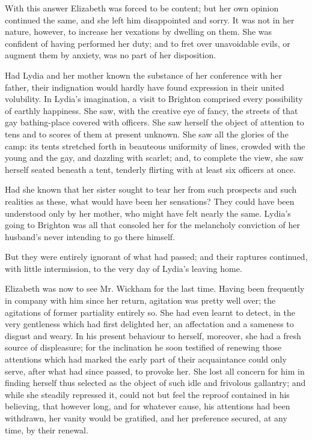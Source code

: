 With this answer Elizabeth was forced to be content; but her own opinion continued the same, and she left him disappointed and sorry. It was not in her nature, however, to increase her vexations by dwelling on them. She was confident of having performed her duty; and to fret over unavoidable evils, or augment them by anxiety, was no part of her disposition.

Had Lydia and her mother known the substance of her conference with her father, their indignation would hardly have found expression in their united volubility. In Lydia's imagination, a visit to Brighton comprised every possibility of earthly happiness. She saw, with the creative eye of fancy, the streets of that gay bathing-place covered with officers. She saw herself the object of attention to tens and to scores of them at present unknown. She saw all the glories of the camp: its tents stretched forth in beauteous uniformity of lines, crowded with the young and the gay, and dazzling with scarlet; and, to complete the view, she saw herself seated beneath a tent, tenderly flirting with at least six officers at once.



Had she known that her sister sought to tear her from such prospects and such realities as these, what would have been her sensations? They could have been understood only by her mother, who might have felt nearly the same. Lydia's going to Brighton was all that consoled her for the melancholy conviction of her husband's never intending to go there himself.

But they were entirely ignorant of what had passed; and their raptures continued, with little intermission, to the very day of Lydia's leaving home.

Elizabeth was now to see Mr. Wickham for the last time. Having been frequently in company with him since her return, agitation was pretty well over; the agitations of former partiality entirely so. She had even learnt to detect, in the very gentleness which had first delighted her, an affectation and a sameness to disgust and weary. In his present behaviour to herself, moreover, she had a fresh source of displeasure; for the inclination he soon testified of renewing those attentions which had marked the early part of their acquaintance could only serve, after what had since passed, to provoke her. She lost all concern for him in finding herself thus selected as the object of such idle and frivolous gallantry; and while she steadily repressed it, could not but feel the reproof contained in his believing, that however long, and for whatever cause, his attentions had been withdrawn, her vanity would be gratified, and her preference secured, at any time, by their renewal.

